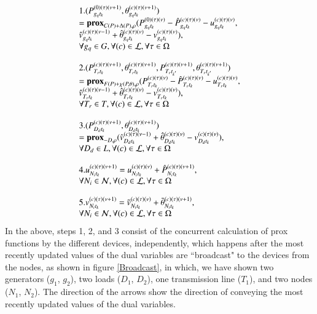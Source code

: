 \documentclass[preprint,12pt,3p]{elsarticle}
\begin{document}
\begin{equation}\label{Prox_Lookahead_Demand}
\begin{array}{ll}
1.(P_{{g_q}{t_k}}^{(0)(\tau)(\nu+1)},\theta_{{g_q}{t_k}}^{(c)(\tau)(\nu+1)})\notag\\=\mathbf{prox}_{C(P)+\Delta(P),\rho}(P_{{g_q}{t_k}}^{(0)(\tau)(\nu)}-\hat{P}_{{g_q}{t_k}}^{(c)(\tau)(\nu)}-u_{{g_q}{t_k}}^{(c)(\tau)(\nu)},\\ \hat{v}_{{g_q}{t_k}}^{(c)(\tau)(\nu-1)}+\hat{\theta}_{{g_q}{t_k}}^{(c)(\tau)(\nu)}-v_{{g_q}{t_k}}^{(c)(\tau)(\nu)}),\\\forall g_q\in G,\forall(c)\in\mathcal{L},\forall\tau\in\Omega\\
\\
2.(P_{{T_r}{t_k}}^{(c)(\tau)(\nu+1)},\theta_{{T_r}{t_k}}^{(c)(\tau)(\nu+1)},P_{{T_r}{t_{k^{'}}}}^{(c)(\tau)(\nu+1)},\theta_{{T_r}{t_{k^{'}}}}^{(c)(\tau)(\nu+1)})\notag\\=\mathbf{prox}_{F(P)+\chi(P,\theta),\rho}(P_{{T_r}{t_k}}^{(c)(\tau)(\nu)}-\hat{P}_{{T_r}{t_k}}^{(c)(\tau)(\nu)}-u_{{T_r}{t_k}}^{(c)(\tau)(\nu)}, \\\hat{v}_{{T_r}{t_k}}^{(c)(\tau)(\nu-1)}+\hat{\theta}_{{T_r}{t_k}}^{(c)(\tau)(\nu)}-v_{{T_r}{t_k}}^{(c)(\tau)(\nu)}),
\\\forall T_r\in T,\forall(c)\in\mathcal{L},\forall\tau\in\Omega\\
\\
3.(P_{{D_d}{t_k}}^{(c)(\tau)(\nu+1)},\theta_{{D_d}{t_k}}^{(c)(\tau)(\nu+1)})\notag\\=\mathbf{prox}_{-D,\rho}(\hat{v}_{{D_d}{t_k}}^{(c)(\tau)(\nu-1)}+\hat{\theta}_{{D_d}{t_k}}^{(c)(\tau)(\nu)}-v_{{D_d}{t_k}}^{(c)(\tau)(\nu)}),\\\forall D_d\in L,\forall(c)\in\mathcal{L},\forall\tau\in\Omega\\
\\
4.u_{{N_i}{t_k}}^{(c)(\tau)(\nu+1)}=u_{{N_i}{t_k}}^{(c)(\tau)(\nu)}+\hat{P}_{{N_i}{t_k}}^{(c)(\tau)(\nu+1)},\\\forall N_i\in\mathcal{N},\forall(c)\in\mathcal{L},\forall\tau\in\Omega\\
\\
5.v_{{N_i}{t_k}}^{(c)(\tau)(\nu+1)}=\tilde{v}_{{N_i}{t_k}}^{(c)(\tau)(\nu)}+\tilde{\theta}_{{N_i}{t_k}}^{(c)(\tau)(\nu+1)},\\\forall N_i\in\mathcal{N},\forall(c)\in\mathcal{L},\forall\tau\in\Omega
\end{array}
\end{equation}
In the above, steps 1, 2, and 3 consist of the concurrent calculation of prox functions by the different devices, independently, which happens after the most recently updated values of the dual variables are ``broadcast" to the devices from the nodes, as shown in figure \ref{Broadcast}, in which, we have shown two generators ($g_1$, $g_2$), two loads ($D_1$, $D_2$), one transmission line ($T_1$), and two nodes ($N_1$, $N_2$). The direction of the arrows show the direction of conveying the most recently updated values of the dual variables.
\end{document}
